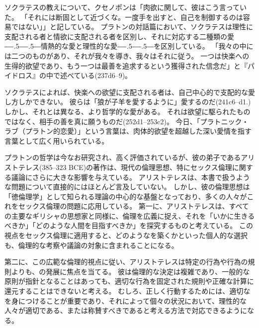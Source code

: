 \documentclass[paper=a4,book,openany]{jlreq}
\def\DDASH{―\kern-.5\zw―\kern-.5\zw―} %
\begin{document}
ソクラテスの教えについて、クセノポンは「肉欲に関して、彼はこう言っていた。
「それには断固として近づくな。一度手を出すと、自己を制御するのは容易ではない」」\citep{xenophon13:_memor}と記している。
プラトンの対話篇において、ソクラテスは理性に支配される者と情欲に支配される者を区別し、それに対応する二種類の愛{\DDASH}情熱的な愛と理性的な愛{\DDASH}を区別している。
「我々の中には二つのものがあり、それが我々を導き、我々はそれに従う。
一つは快楽への生得的欲望であり、もう一つは最善を追求するという獲得された信念だ」と『パイドロス』の中で述べている(237d6--9)。

ソクラテスによれば、快楽への欲望に支配される者は、自己中心的で支配的な愛し方しかできない。
彼らは「狼が子羊を愛するように」愛するのだ(241c6--d1.)%
しかし、それとは異なる、より哲学的な愛がある。
それは欲望に駆られたものではなく、相手の善を真に願うものだ(252d1--253c2)。
今日、「プラトニック・ラブ（プラトン的恋愛）」という言葉は、肉体的欲望を超越した深い愛情を指す言葉として広く用いられている。

プラトンの哲学は今なお研究され、高く評価されているが、彼の弟子であるアリストテレス(385--323 BCE)の著作は、現代の倫理思想、特にセックス倫理に関する議論にさらに大きな影響を与えている。
アリストテレスは、本書で扱うような問題について直接的にはほとんど言及していない。
しかし、彼の倫理思想は「徳倫理学」として知られる理論の中心的な基盤となっており、多くの人々がこれをセックス倫理の問題に応用している。
第一に、アリストテレスは、すべての主要なギリシャの思想家と同様に、倫理を広義に捉え、それを「いかに生きるべきか」「どのような人間を目指すべきか」を探究するものと考えている。
この視点をセックス倫理に適用すると、どのようなを築くかといった個人的な選択も、倫理的な考察や議論の対象に含まれることになる。

第二に、この広範な倫理的視点に従い、アリストテレスは特定の行為や行為の規則よりも、の発展に焦点を当てる。
彼は倫理的な決定は複雑であり、一般的な原則が指針となることはあっても、適切な行為を固定された規則や正確な計算に還元することはできないと考える。
むしろ、正しく行動するためには、適切なを身につけることが重要であり、それによって個々の状況において、理性的な人々が適切である、または称賛すべきであると考える方法で対応できるようになる。
\end{document}
